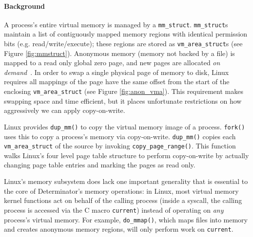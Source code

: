 \begin{itemize}
\paragraph{Background}
A process's entire virtual memory is managed by a {\tt mm\_struct}.
{\tt mm\_struct}s maintain a list of contiguously mapped memory regions with
identical permission bits (e.g. read/write/execute); these regions are stored as
{\tt vm\_area\_struct}s (see Figure \ref{fig:mmstruct}). Anonymous memory
(memory not backed by a file) is mapped to a
read only global zero page, and new pages
are allocated \emph{on demand}~\cite{li1989memory}. In order to swap a single
physical page of memory to disk, Linux requires all mappings of the page have
the same offset from the start of the enclosing {\tt vm\_area\_struct} (see
Figure \ref{fig:anon_vma}). This
requirement makes swapping space and time efficient, but it places unfortunate
restrictions on how aggressively we can apply copy-on-write.

Linux provides {\tt dup\_mm()} to copy the virtual memory image of a process.
{\tt fork()} uses this to copy a process's memory via copy-on-write.
{\tt dup\_mm()} copies each {\tt vm\_area\_struct} of the source by invoking
{\tt copy\_page\_range()}. This function walks Linux's four level
page table structure to perform copy-on-write by actually changing page table
entries and marking the pages as read only.

Linux's memory subsystem does lack one important generality that is essential to
the core of Determinator's memory operations: in Linux, most virtual memory
kernel functions act on behalf
of the calling process (inside a syscall, the calling process is accessed via
the C macro {\tt current}) instead of operating on \emph{any} process's
virtual memory. For example, {\tt do\_mmap()}, which maps files into memory and
creates anonymous memory regions, will only perform work on {\tt current}.

\end{itemize}
